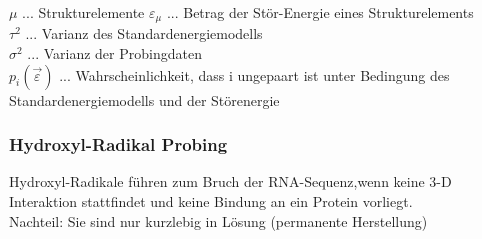 $\mu$ ... Strukturelemente
$\varepsilon_{\mu}$ ... Betrag der Stör-Energie eines Strukturelements\\
$\tau^2$ ... Varianz des Standardenergiemodells \\
$\sigma^2$ ... Varianz der Probingdaten \\
$p_i(\vec{\varepsilon})$ ... Wahrscheinlichkeit, dass i ungepaart ist unter Bedingung des Standardenergiemodells und der Störenergie

\subsubsection{Hydroxyl-Radikal Probing}
Hydroxyl-Radikale führen zum Bruch der RNA-Sequenz,wenn keine 3-D Interaktion stattfindet und keine Bindung an ein Protein vorliegt.\\
Nachteil: Sie sind nur kurzlebig in Lösung (permanente Herstellung)

